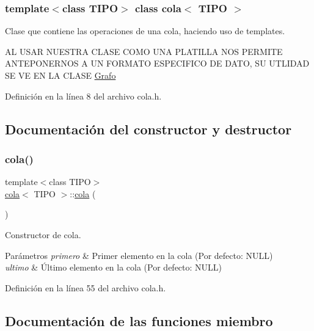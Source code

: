 \subsubsection*{template$<$class T\+I\+PO$>$\newline
class cola$<$ T\+I\+P\+O $>$}

Clase que contiene las operaciones de una cola, haciendo uso de templates. 

AL U\+S\+AR N\+U\+E\+S\+T\+RA C\+L\+A\+SE C\+O\+MO U\+NA P\+L\+A\+T\+I\+L\+LA N\+OS P\+E\+R\+M\+I\+TE A\+N\+T\+E\+P\+O\+N\+E\+R\+N\+OS A UN F\+O\+R\+M\+A\+TO E\+S\+P\+E\+C\+I\+F\+I\+CO DE D\+A\+TO, SU U\+T\+L\+I\+D\+AD SE VE EN LA C\+L\+A\+SE \hyperlink{classGrafo}{Grafo} 

Definición en la línea 8 del archivo cola.\+h.



\subsection{Documentación del constructor y destructor}
\mbox{\label{classcola_acf21bbf0b0795607993d5ffe736398ae}} 
\subsubsection{\texorpdfstring{cola()}{cola()}}
{\footnotesize\ttfamily template$<$class T\+I\+PO$>$ \\
\hyperlink{classcola}{cola}$<$ T\+I\+PO $>$\+::\hyperlink{classcola}{cola} (\begin{DoxyParamCaption}{ }\end{DoxyParamCaption})\hspace{0.3cm}{\ttfamily [inline]}}



Constructor de cola. 


\begin{DoxyParams}{Parámetros}
{\em primero} & Primer elemento en la cola (Por defecto\+: N\+U\+LL) \\
\hline
{\em ultimo} & Último elemento en la cola (Por defecto\+: N\+U\+LL) \\
\hline
\end{DoxyParams}


Definición en la línea 55 del archivo cola.\+h.



\subsection{Documentación de las funciones miembro}
\mbox{\label{classcola_a4fe29cbff3478979d38a0f8a2d7a4b51}} 

